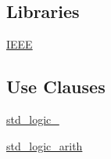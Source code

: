 \subsection*{Libraries}
 \begin{DoxyCompactItemize}
\item 
\hyperlink{classcalc__ctrl_1_1rtl_ae4f03c286607f3181e16b9aa12d0c6d4}{I\+E\+EE} 
\end{DoxyCompactItemize}
\subsection*{Use Clauses}
 \begin{DoxyCompactItemize}
\item 
\hyperlink{classcalc__ctrl_1_1rtl_acd03516902501cd1c7296a98e22c6fcb}{std\+\_\+logic\+\_}   
\item 
\hyperlink{classcalc__ctrl_1_1rtl_a0f5ecc6613f63d07f7963a97b1b26095}{std\+\_\+logic\+\_\+arith}   
\end{DoxyCompactItemize}
